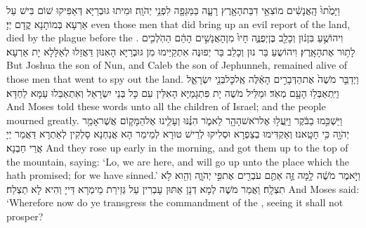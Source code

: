 {וַיָּמֻ֙תוּ֙ הָֽאֲנָשִׁ֔ים מוֹצִאֵ֥י דִבַּת\maqqaf הָאָ֖רֶץ רָעָ֑ה בַּמַּגֵּפָ֖ה לִפְנֵ֥י יְהֹוָֽה׃}
{וּמִיתוּ גּוּבְרַיָּא דְּאַפִּיקוּ שׁוֹם בִּישׁ עַל אַרְעָא בְּמוֹתָנָא קֳדָם יְיָ׃}
{even those men that did bring up an evil report of the land, died by the plague before the \lord.}{}
{וִיהוֹשֻׁ֣עַ בִּן\maqqaf נ֔וּן וְכָלֵ֖ב בֶּן\maqqaf יְפֻנֶּ֑ה חָיוּ֙ מִן\maqqaf הָאֲנָשִׁ֣ים הָהֵ֔ם הַהֹֽלְכִ֖ים לָת֥וּר אֶת\maqqaf הָאָֽרֶץ׃}
{וִיהוֹשֻעַ בַּר נוּן וְכָלֵב בַּר יְפוּנֶּה אִתְקַיַּימוּ מִן גּוּבְרַיָּא הָאִנּוּן דַּאֲזַלוּ לְאַלָּלָא יָת אַרְעָא׃}
{But Joshua the son of Nun, and Caleb the son of Jephunneh, remained alive of those men that went to spy out the land.}{}
{וַיְדַבֵּ֤ר מֹשֶׁה֙ אֶת\maqqaf הַדְּבָרִ֣ים הָאֵ֔לֶּה אֶֽל\maqqaf כׇּל\maqqaf בְּנֵ֖י יִשְׂרָאֵ֑ל וַיִּֽתְאַבְּל֥וּ הָעָ֖ם מְאֹֽד׃}
{וּמַלֵּיל מֹשֶׁה יָת פִּתְגָמַיָּא הָאִלֵּין עִם כָּל בְּנֵי יִשְׂרָאֵל וְאִתְאַבַּלוּ עַמָּא לַחְדָּא׃}
{And Moses told these words unto all the children of Israel; and the people mourned greatly.}{}
{וַיַּשְׁכִּ֣מוּ בַבֹּ֔קֶר וַיַּֽעֲל֥וּ אֶל\maqqaf רֹאשׁ\maqqaf הָהָ֖ר לֵאמֹ֑ר הִנֶּ֗נּוּ וְעָלִ֛ינוּ אֶל\maqqaf הַמָּק֛וֹם אֲשֶׁר\maqqaf אָמַ֥ר יְהֹוָ֖ה כִּ֥י חָטָֽאנוּ׃}
{וְאַקְדִּימוּ בְצַפְרָא וּסְלִיקוּ לְרֵישׁ טוּרָא לְמֵימַר הָא אֲנַחְנָא סָלְקִין לְאַתְרָא דַּאֲמַר יְיָ אֲרֵי חַבְנָא׃}
{And they rose up early in the morning, and got them up to the top of the mountain, saying: ‘Lo, we are here, and will go up unto the place which the \lord\space hath promised; for we have sinned.’}{}
{וַיֹּ֣אמֶר מֹשֶׁ֔ה לָ֥מָּה זֶּ֛ה אַתֶּ֥ם עֹבְרִ֖ים אֶת\maqqaf פִּ֣י יְהֹוָ֑ה וְהִ֖וא לֹ֥א תִצְלָֽח׃}
{וַאֲמַר מֹשֶׁה לְמָא דְנָן אַתּוּן עָבְרִין עַל גְּזֵירַת מֵימְרָא דַּייָ וְהִיא לָא תַצְלַח׃}
{And Moses said: ‘Wherefore now do ye transgress the commandment of the \lord, seeing it shall not prosper?}{}
